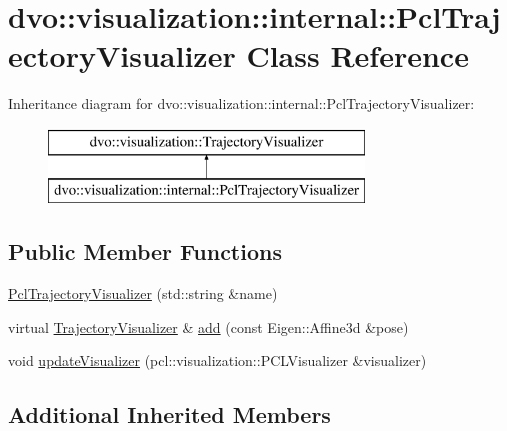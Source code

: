\hypertarget{classdvo_1_1visualization_1_1internal_1_1_pcl_trajectory_visualizer}{}\section{dvo\+:\+:visualization\+:\+:internal\+:\+:Pcl\+Trajectory\+Visualizer Class Reference}
\label{classdvo_1_1visualization_1_1internal_1_1_pcl_trajectory_visualizer}
Inheritance diagram for dvo\+:\+:visualization\+:\+:internal\+:\+:Pcl\+Trajectory\+Visualizer\+:\begin{figure}[H]
\begin{center}
\leavevmode
\includegraphics[height=2.000000cm]{classdvo_1_1visualization_1_1internal_1_1_pcl_trajectory_visualizer}
\end{center}
\end{figure}
\subsection*{Public Member Functions}
\begin{DoxyCompactItemize}
\item 
\mbox{\hyperlink{classdvo_1_1visualization_1_1internal_1_1_pcl_trajectory_visualizer_a666f91d73d3a6ae83444bcca62e36bec}{Pcl\+Trajectory\+Visualizer}} (std\+::string \&name)
\item 
virtual \mbox{\hyperlink{classdvo_1_1visualization_1_1_trajectory_visualizer}{Trajectory\+Visualizer}} \& \mbox{\hyperlink{classdvo_1_1visualization_1_1internal_1_1_pcl_trajectory_visualizer_aa174b5910657b2bfed45dfacd429a75a}{add}} (const Eigen\+::\+Affine3d \&pose)
\item 
void \mbox{\hyperlink{classdvo_1_1visualization_1_1internal_1_1_pcl_trajectory_visualizer_a16c8c79c3773408afba9ef57fcaea9e2}{update\+Visualizer}} (pcl\+::visualization\+::\+P\+C\+L\+Visualizer \&visualizer)
\end{DoxyCompactItemize}
\subsection*{Additional Inherited Members}


